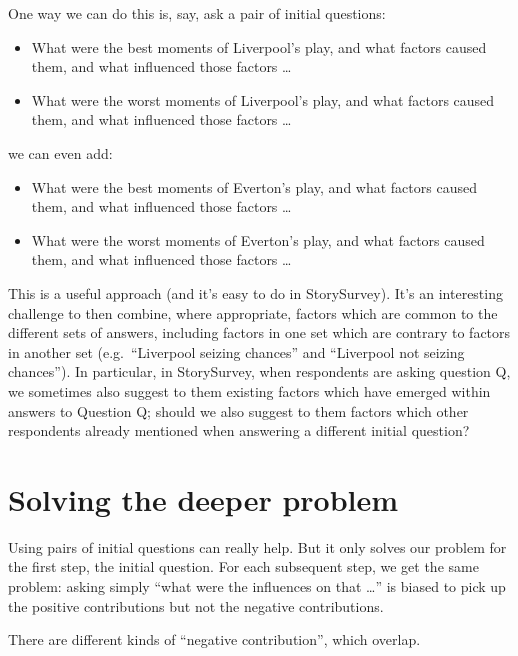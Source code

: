 \documentclass[
]{book}
\providecommand{\tightlist}{%
  \setlength{\itemsep}{0pt}\setlength{\parskip}{0pt}}
\begin{document}
One way we can do this is, say, ask a pair of initial questions:

\begin{itemize}
\tightlist
\item
  What were the best moments of Liverpool's play, and what factors caused them, and what influenced those factors \ldots{}
\item
  What were the worst moments of Liverpool's play, and what factors caused them, and what influenced those factors \ldots{}
\end{itemize}

we can even add:

\begin{itemize}
\tightlist
\item
  What were the best moments of Everton's play, and what factors caused them, and what influenced those factors \ldots{}
\item
  What were the worst moments of Everton's play, and what factors caused them, and what influenced those factors \ldots{}
\end{itemize}

This is a useful approach (and it's easy to do in StorySurvey). It's an interesting challenge to then combine, where appropriate, factors which are common to the different sets of answers, including factors in one set which are contrary to factors in another set (e.g.~``Liverpool seizing chances'' and ``Liverpool not seizing chances''). In particular, in StorySurvey, when respondents are asking question Q, we sometimes also suggest to them existing factors which have emerged within answers to Question Q; should we also suggest to them factors which other respondents already mentioned when answering a different initial question?

\hypertarget{solving-the-deeper-problem}{%
\section{Solving the deeper problem}\label{solving-the-deeper-problem}}

Using pairs of initial questions can really help. But it only solves our problem for the first step, the initial question. For each subsequent step, we get the same problem: asking simply ``what were the influences on that \ldots{}'' is biased to pick up the positive contributions but not the negative contributions.

There are different kinds of ``negative contribution'', which overlap.
\end{document}
